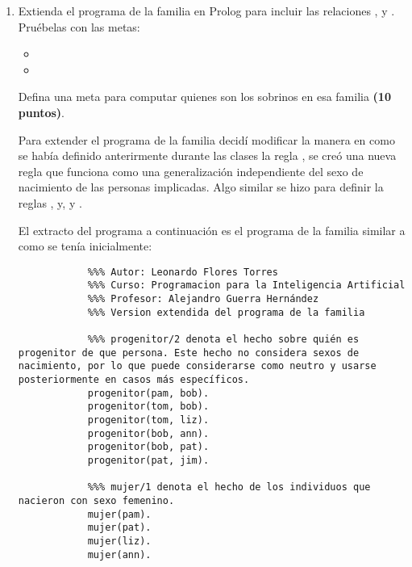 \begin{enumerate}
    \item Extienda el programa de la familia en Prolog para incluir las relaciones , y . Pruébelas con las metas:
    \begin{itemize}
        \item {}
        \item {}
    \end{itemize}
    Defina una meta para computar quienes son los sobrinos en esa familia \textbf{(10 puntos)}.
    \begin{solution}
        Para extender el programa de la familia decidí modificar la manera en como se había definido anterirmente durante las clases \cite{guerra2022pia} la regla , se creó una nueva regla  que funciona como una generalización independiente del sexo de nacimiento de las personas implicadas. Algo similar se hizo para definir la reglas ,  y,  y .

        El extracto del programa a continuación es el programa de la familia similar a como se tenía inicialmente:
        \begin{verbatim}
            %%% Autor: Leonardo Flores Torres
            %%% Curso: Programacion para la Inteligencia Artificial
            %%% Profesor: Alejandro Guerra Hernández
            %%% Version extendida del programa de la familia
            
            %%% progenitor/2 denota el hecho sobre quién es progenitor de que persona. Este hecho no considera sexos de nacimiento, por lo que puede considerarse como neutro y usarse posteriormente en casos más específicos.
            progenitor(pam, bob).
            progenitor(tom, bob).
            progenitor(tom, liz).
            progenitor(bob, ann).
            progenitor(bob, pat).
            progenitor(pat, jim).
            
            %%% mujer/1 denota el hecho de los individuos que nacieron con sexo femenino.
            mujer(pam).
            mujer(pat).
            mujer(liz).
            mujer(ann).
            

\end{verbatim}
\end{solution}
\end{enumerate}
